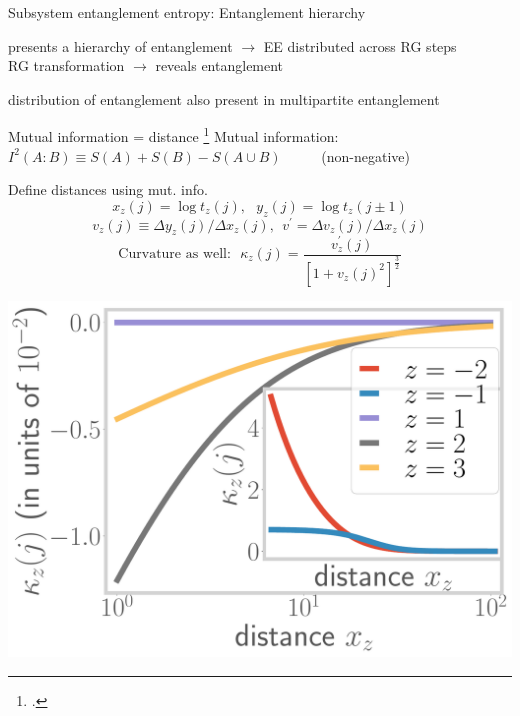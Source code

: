 \documentclass[9pt,aspectratio=169]{beamer}
\begin{document}
\begin{frame}{Subsystem entanglement entropy: Entanglement hierarchy}
\vspace*{\fill}

\begin{itemize}
	\nitem 
presents a \alert{hierarchy} of entanglement \(\longrightarrow\) EE distributed across RG steps\\
RG transformation \(\longrightarrow\) reveals entanglement

\vspace*{\fill}
\nitem distribution of entanglement also present in \alert{multipartite} entanglement
\end{itemize}

\end{frame}

\begin{frame}{Mutual information = distance}
\footcite{van2010building,lee2016,anirban_mott_2022,lee2010,lee2014,qi2013,lee2016,anirbanurg1,anirbanurg2,ryu2006,ryu2006aspects,nozaki2012}
\alert{Mutual information}: ~ \(I^2(A:B) \equiv S(A) + S(B) - S(A \cup B)\) ~ ~ ~ (non-negative)\\[10pt]

	\begin{minipage}{0.5\textwidth}
	Define distances using mut. info.
	\[x_z(j) = \log t_z(j),~ ~ ~y_z(j) = \log t_z(j \pm 1)\]
	\[v_z(j) \equiv \Delta y_z(j)/\Delta x_z(j), ~~ v^\prime = \Delta v_z(j)/\Delta x_z(j)\]
	\[\text{Curvature as well:} ~ ~ ~\kappa_{z}(j) = \frac{v^\prime_z(j)}{\left[1 + v_z(j)^2\right]^\frac{3}{2}}\]
	\end{minipage}
	\begin{minipage}{0.49\textwidth}
		\includegraphics[width=\textwidth]{curvature-pos.pdf}
	\end{minipage}
\end{frame}
\end{document}
